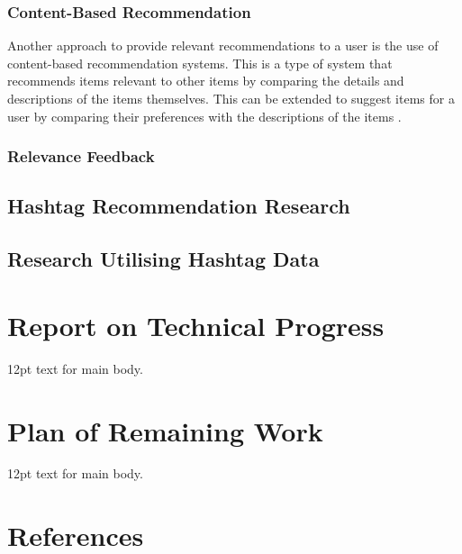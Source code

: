 \documentclass[12pt,a4paper]{article}
\begin{document}
\subsubsection{Content-Based Recommendation}
Another approach to provide relevant recommendations to a user is the use of content-based recommendation systems. This is a type of system that recommends items relevant to other items by comparing the details and descriptions of the items themselves. This can be extended to suggest items for a user by comparing their preferences with the descriptions of the items \parencite{Pazzani:2007}.

\subsubsection{Relevance Feedback}

\subsection{Hashtag Recommendation Research}


\subsection{Research Utilising Hashtag Data}
\pagebreak

\section{Report on Technical Progress}
12pt text for main body.
\pagebreak

\section{Plan of Remaining Work}
12pt text for main body.
\pagebreak

\setcounter{secnumdepth}{0}
\section{References}
\printbibliography[heading=none]
\end{document}

